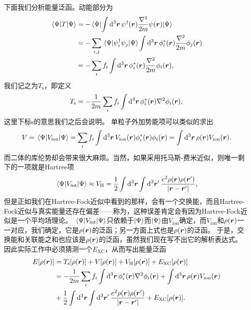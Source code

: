 下面我们分析能量泛函。动能部分为
\[
    \begin{aligned}
        \mel{\Psi}{T}{\Psi} &= - \mel{\Psi}{\int \dd[3]{\vb*{r}} \psi^\dagger(\vb*{r}) \frac{\laplacian}{2m} \psi(\vb*{r})}{\Psi} \\
        &= - \sum_{i, j} \mel{\Psi}{\psi_i^\dagger \psi_j}{\Psi} \int \dd[3]{\vb*{r}} \phi^*_i(\vb*{r}) \frac{\laplacian}{2m} \phi_j(\vb*{r}) \\
        &= - \sum_i f_i \int \dd[3]{\vb*{r}} \phi^*_i(\vb*{r}) \frac{\laplacian}{2m} \phi_i(\vb*{r}),
    \end{aligned}
\]
我们记之为$T_\text{s}$，即定义
\begin{equation}
    T_\text{s} = - \frac{1}{2m} \sum_i f_i \int \dd[3]{\vb*{r}} \phi_i^*(\vb*{r}) \laplacian \phi_i(\vb*{r}),
\end{equation}
这里下标s的意思我们之后会说明。
单粒子外加势能项可以类似的求出
\begin{equation}
    V = \mel{\Psi}{{V}_\text{ion}}{\Psi} = \sum_i f_i \int \dd[3]{\vb*{r}} V_{\text{ion}}(\vb*{r}) \phi_i^*(\vb*{r}) \phi_i(\vb*{r}) = \int \dd[3]{\vb*{r}} \rho(\vb*{r}) V_\text{ion}(\vb*{r}).
\end{equation}
而二体的库伦势却会带来很大麻烦。当然，如果采用托马斯-费米近似，则唯一剩下的一项就是Hartree项
\begin{equation}
    \mel{\Psi}{{V}_\text{int}}{\Psi} \approx V_{\text{H}} = \frac{1}{2} \int \dd[3]{\vb*{r}} \int \dd[3]{\vb*{r}'} \frac{e^2 \rho(\vb*{r}) \rho(\vb*{r}')}{\abs{\vb*{r} - \vb*{r}'}},
    \label{eq:dft-hartree-term}
\end{equation}
但是正如我们在Hartree-Fock近似中看到的那样，会有一个交换能，而且Hartree-Fock近似与真实能量还存在偏差——称为，这种误差肯定会有因为Hartree-Fock近似是一个平均场理论。
$\mel{\Psi}{{V}_\text{int}}{\Psi}$只依赖于$\ket{\Psi}$而$\ket{\Psi}$由$V_\text{ion}$确定，而$V_\text{ion}$和$\rho(\vb*{r})$一一对应，我们确定，它是$\rho(\vb*{r})$的泛函；另一方面上式也是$\rho(\vb*{r})$的泛函。
于是，交换能和关联能之和也应该是$\rho(\vb*{r})$的泛函，虽然我们现在写不出它的解析表达式。
因此实际工作中必须猜测一个$E_\text{XC}$，从而写出能量泛函
\begin{equation}
    \begin{aligned}
        E[\rho(\vb*{r})] &= T_\text{s}[\rho(\vb*{r})] + V[\rho(\vb*{r})] + V_\text{H}[\rho(\vb*{r})] + E_\text{XC} [\rho(\vb*{r})] \\
        &= - \frac{1}{2m} \sum_i f_i \int \dd[3]{\vb*{r}} \phi_i^*(\vb*{r}) \laplacian \phi_i(\vb*{r})
        + \int \dd[3]{\vb*{r}} \rho(\vb*{r}) V_\text{ion}(\vb*{r}) \\
        &+ \frac{1}{2} \int \dd[3]{\vb*{r}} \int \dd[3]{\vb*{r}'} \frac{e^2 \rho(\vb*{r}) \rho(\vb*{r}')}{\abs{\vb*{r} - \vb*{r}'}} + E_\text{XC} [\rho(\vb*{r})].
    \end{aligned}
    \label{eq:kohn-sham-functional}
\end{equation}
